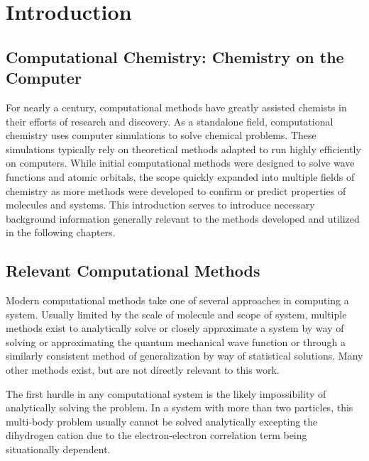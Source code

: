 \chapter{Introduction}
\label{ch:Introduction}

\section{Computational Chemistry: Chemistry on the Computer}

For nearly a century, computational methods have greatly assisted chemists in their efforts of research and discovery.
As a standalone field, computational chemistry uses computer simulations to solve chemical problems. 
These simulations typically rely on theoretical methods adapted to run highly efficiently on computers.
While initial computational methods were designed to solve wave functions and atomic orbitals, the scope quickly expanded into multiple fields of chemistry as more methods were developed to confirm or predict properties of molecules and systems.
This introduction serves to introduce necessary background information generally relevant to the methods developed and utilized in the following chapters.

\section{Relevant Computational Methods}


Modern computational methods take one of several approaches in computing a system.
Usually limited by the scale of molecule and scope of system, multiple methods exist to analytically solve or closely approximate a system by way of solving or approximating the quantum mechanical wave function or through a similarly consistent method of generalization by way of statistical solutions.
Many other methods exist, but are not directly relevant to this work.

The first hurdle in any computational system is the likely impossibility of analytically solving the problem. 
In a system with more than two particles, this multi-body problem usually cannot be solved analytically excepting the dihydrogen cation due to the electron-electron correlation term being situationally dependent.

